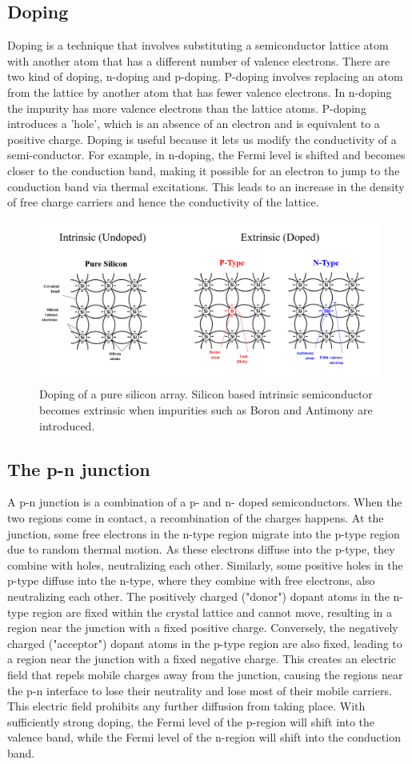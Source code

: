 \documentclass{article}
\begin{document}
\subsection{Doping}
Doping is a technique that involves substituting a semiconductor lattice atom with another atom that has a different number of valence electrons. There are two kind of doping, n-doping and p-doping. P-doping involves replacing an atom from the lattice by another atom that has fewer valence electrons. In n-doping the impurity has more valence electrons than the lattice atoms. P-doping introduces a 'hole', which is an absence of an electron and is equivalent to a positive charge. Doping is useful because it lets us modify the conductivity of a semi-conductor. For example, in n-doping, the Fermi level is shifted and becomes closer to the conduction band, making it possible for an electron to jump to the conduction band via thermal excitations. This leads to an increase in the density of free charge carriers and hence the conductivity of the lattice. 
\begin{figure}[h]
    \centering
    \includegraphics[width=0.5\linewidth]{Figures/wiki1.png}
    \caption{Doping of a pure silicon array. Silicon based intrinsic semiconductor becomes extrinsic when impurities such as Boron and Antimony are introduced. \cite{wikipediacontributors_2019_doping}}
    \label{fig:enter-label}
\end{figure}
\pagebreak{}
\subsection{The p-n junction}
A p-n junction is a combination of a p- and n- doped semiconductors. When the two regions come in contact, a recombination of the charges happens. At the junction, some free electrons in the n-type region migrate into the p-type region due to random thermal motion. As these electrons diffuse into the p-type, they combine with holes, neutralizing each other. Similarly, some positive holes in the p-type diffuse into the n-type, where they combine with free electrons, also neutralizing each other. The positively charged ("donor") dopant atoms in the n-type region are fixed within the crystal lattice and cannot move, resulting in a region near the junction with a fixed positive charge. Conversely, the negatively charged ("acceptor") dopant atoms in the p-type region are also fixed, leading to a region near the junction with a fixed negative charge. This creates an electric field that repels mobile charges away from the junction, causing the regions near the p-n interface to lose their neutrality and lose most of their mobile carriers. This electric field prohibits any further diffusion from taking place. With sufficiently strong doping, the Fermi level of the p-region will shift into the valence band, while the Fermi level of the n-region will shift into the conduction band. 
\end{document}
